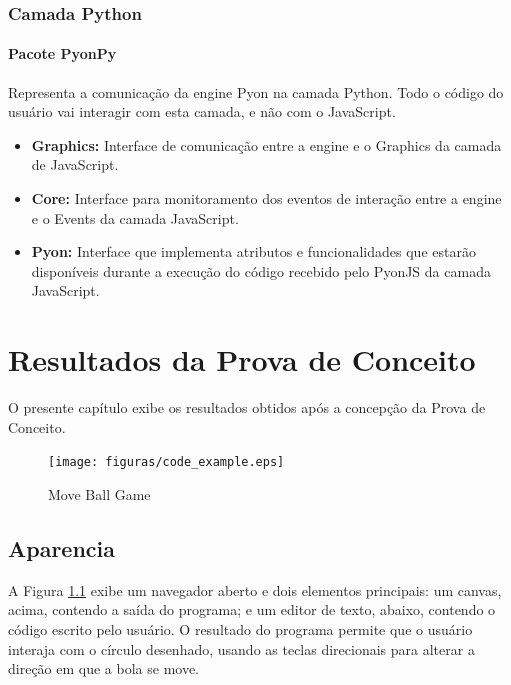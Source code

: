 \begin{apendicesenv}
\subsection{Camada Python}

\subsubsection{Pacote PyonPy}

Representa a comunicação da engine Pyon na camada Python. Todo o código do usuário vai interagir com esta camada, e não com o JavaScript. 

\begin{itemize}
    \item \textbf{Graphics:} Interface de comunicação entre a engine e o Graphics da camada de JavaScript.
    \item \textbf{Core:} Interface para monitoramento dos eventos de interação entre a engine e o Events da camada JavaScript.
    \item \textbf{Pyon:} Interface que implementa atributos e funcionalidades que estarão disponíveis durante a execução do código recebido pelo PyonJS da camada JavaScript.
\end{itemize}

%
%

\chapter[Resultados da Prova de Conceito]{Resultados da Prova de Conceito}
\label{apendice:resultados_poc}

O presente capítulo exibe os resultados obtidos após a concepção da Prova de Conceito.

\begin{figure}[!ht]
    \centering
    \caption{Move Ball Game}
    \texttt{[image: figuras/code\_example.eps]}
    \label{fig:code}
\end{figure}

\section{Aparencia}

A Figura \ref{fig:code} exibe um navegador aberto e dois elementos principais: um canvas, acima, contendo a saída do programa; e um editor de texto, abaixo, contendo o código escrito pelo usuário. O resultado do programa permite que o usuário interaja com o círculo desenhado, usando as teclas direcionais para alterar a direção em que a bola se move. 


\end{apendicesenv}
